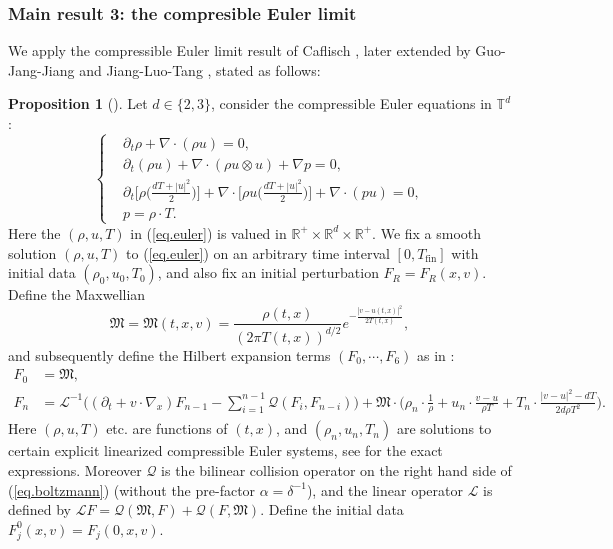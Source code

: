 \documentclass[10pt, reqno]{amsart}
\newcommand{\Rb}{\mathbb R}
\newcommand{\Tb}{\mathbb T}
\newcommand{\Lc}{\mathcal L}
\newcommand{\Qc}{\mathcal Q}
\newcommand{\Mf}{\mathfrak M}
\theoremstyle{definition}
\newtheorem{proposition}[theorem]{Proposition}
\theoremstyle{remark}
\numberwithin{equation}{section}
\begin{document}
\subsubsection{Main result 3: the compresible Euler limit} We apply the compressible Euler limit result of Caflisch \cite{Caf80}, later extended by Guo-Jang-Jiang \cite{GJJ10} and Jiang-Luo-Tang \cite{JLT21}, stated as follows:
\begin{proposition}[\cite{Caf80,GJJ10,JLT21}]\label{prop.fluid_1} Let $d\in\{2,3\}$, consider the compressible Euler equations in $\Tb^d$:
\begin{equation}\label{eq.euler}
\left\{
\begin{aligned}
&\partial_t\rho+\nabla\cdot(\rho u)=0,\\
&\partial_t(\rho u)+\nabla\cdot(\rho u\otimes u)+\nabla p=0,\\
&\partial_t\bigg[\rho\bigg(\frac{dT+|u|^2}{2}\bigg)\bigg]+\nabla\cdot\bigg[\rho u\bigg(\frac{dT+|u|^2}{2}\bigg)\bigg]+\nabla\cdot(pu)=0,\\
&p=\rho\cdot T.
\end{aligned}
\right.
\end{equation} Here the $(\rho,u,T)$ in (\ref{eq.euler}) is valued in $\Rb^+\times\Rb^d\times\Rb^+$. We fix a smooth solution $(\rho,u,T)$ to (\ref{eq.euler}) on an arbitrary time interval $[0,T_{\mathrm{fin}}]$ with initial data $(\rho_0,u_0,T_0)$, and also fix an initial perturbation $F_R=F_R(x,v)$. 
Define the Maxwellian
\begin{equation}\label{eq.maxwell}\Mf=\Mf(t,x,v)=\frac{\rho(t,x)}{(2\pi T(t,x))^{d/2}}e^{-\frac{|v-u(t,x)|^2}{2T(t,x)}},
\end{equation} and subsequently define the Hilbert expansion terms $(F_0,\cdots,F_6)$ as in \cite{Caf80}:
\begin{equation}\label{eq.hilbert_exp}
\begin{aligned}
F_0&=\Mf,\\
F_{n}&=\Lc^{-1}\bigg((\partial_t+v\cdot\nabla_x)F_{n-1}-\sum_{i=1}^{n-1}\Qc(F_i,F_{n-i})\bigg)+\Mf\cdot\bigg(\rho_n\cdot\frac{1}{\rho}+u_n\cdot\frac{v-u}{\rho T}+T_n\cdot\frac{|v-u|^2-dT}{2d\rho T^2}\bigg).
\end{aligned}
\end{equation} Here $(\rho,u,T)$ etc. are functions of $(t,x)$, and $(\rho_n,u_n,T_n)$ are solutions to certain explicit linearized compressible Euler systems, see \cite{Caf80} for the exact expressions. Moreover $\Qc$ is the bilinear collision operator on the right hand side of (\ref{eq.boltzmann}) (without the pre-factor $\alpha=\delta^{-1}$), and the linear operator $\Lc$ is defined by $\Lc F=\Qc(\Mf,F)+\Qc(F,\Mf)$. Define the initial data $F_j^0(x,v)=F_j(0,x,v)$.


\end{proposition}
\end{document}
